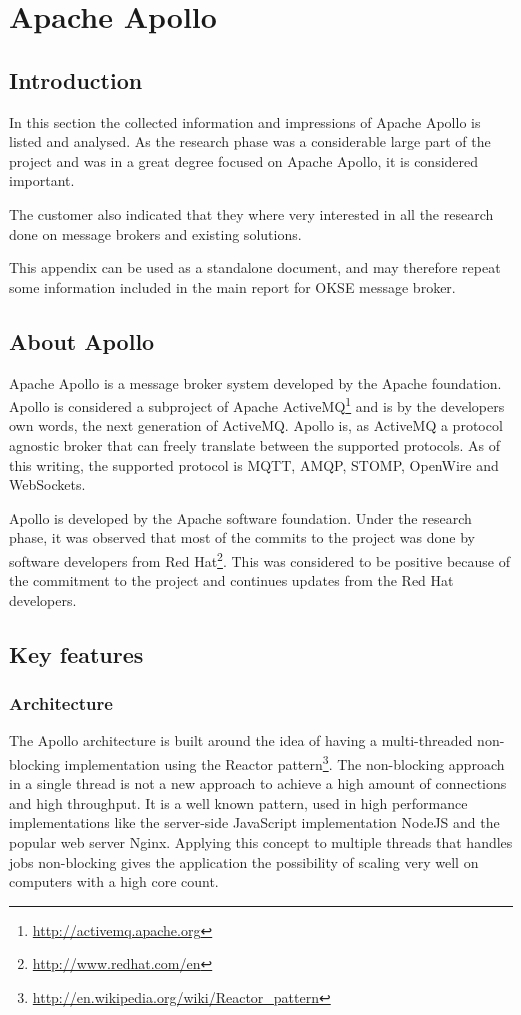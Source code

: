 \chapter{Apache Apollo}
\label{appendix:apache-apollo}

\section{Introduction}
In this section the collected information and impressions of Apache Apollo is listed and analysed. As the research phase was a considerable large part of the project and was in a great degree focused on Apache Apollo, it is considered important.

The customer also indicated that they where very interested in all the research done on message brokers and existing solutions.

This appendix can be used as a standalone document, and may therefore repeat some information included in the main report for OKSE message broker.

\section{About Apollo}
Apache Apollo is a message broker system developed by the Apache foundation. Apollo is considered a subproject of Apache ActiveMQ\footnote{\url{http://activemq.apache.org}} and is by the developers own words, the next generation of ActiveMQ. Apollo is, as ActiveMQ a protocol agnostic broker that can freely translate between the supported protocols. As of this writing, the supported protocol is MQTT, AMQP, STOMP, OpenWire and WebSockets. 

Apollo is developed by the Apache software foundation. Under the research phase, it was observed that most of the commits to the project was done by software developers from Red Hat\footnote{\url{http://www.redhat.com/en}}. This was considered to be positive because of the commitment to the project and continues updates from the Red Hat developers. 

\section{Key features}

\subsection{Architecture}
The Apollo architecture is built around the idea of having a multi-threaded non-blocking implementation using the Reactor pattern\footnote{\url{http://en.wikipedia.org/wiki/Reactor_pattern}}. The non-blocking approach in a single thread is not a new approach to achieve a high amount of connections and high throughput. It is a well known pattern, used in high performance implementations like the server-side JavaScript implementation NodeJS and the popular web server Nginx. Applying this concept to multiple threads that handles jobs non-blocking gives the application the possibility of scaling very well on computers with a high core count. 


